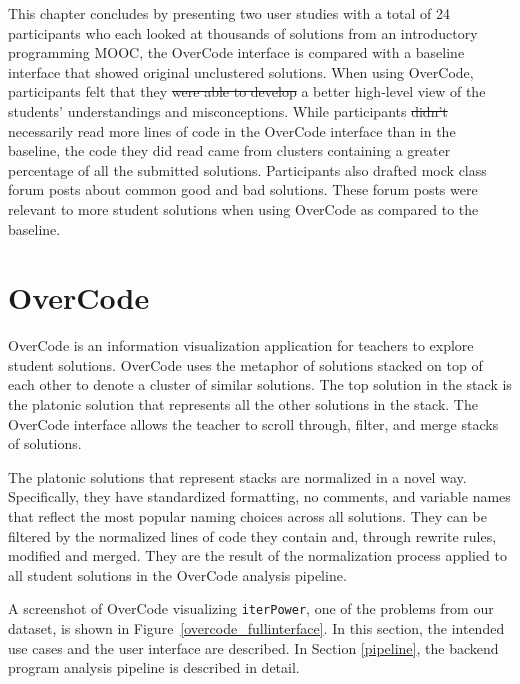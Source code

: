 \documentclass[12pt,twoside]{mitthesis}
\newcommand \codevar[1]{\texttt{#1}}
\providecommand{\DIFaddtex}[1]{{\protect\color{blue}\uwave{#1}}} %
\providecommand{\DIFdeltex}[1]{{\protect\color{red}\sout{#1}}}                      %
\providecommand{\DIFaddbegin}{} %
\providecommand{\DIFaddend}{} %
\providecommand{\DIFdelbegin}{} %
\providecommand{\DIFdelend}{} %
\providecommand{\DIFadd}[1]{\texorpdfstring{\DIFaddtex{#1}}{#1}} %
\providecommand{\DIFdel}[1]{\texorpdfstring{\DIFdeltex{#1}}{}} %
\begin{document}
This chapter concludes by presenting two user studies with a total of 24 participants who each looked at thousands of solutions from an introductory programming MOOC, the OverCode interface is compared with a baseline interface that showed original unclustered solutions. When using OverCode, participants felt that they \DIFdelbegin \DIFdel{were able to develop }\DIFdelend \DIFaddbegin \DIFadd{developed }\DIFaddend a better high-level view of the students' understandings and misconceptions. While participants \DIFdelbegin \DIFdel{didn't }\DIFdelend \DIFaddbegin \DIFadd{did not }\DIFaddend necessarily read more lines of code in the OverCode interface than in the baseline, the code they did read came from clusters containing a greater percentage of all the submitted solutions. Participants also drafted mock class forum posts about common good and bad solutions. These forum posts were relevant to more student solutions when using OverCode as compared to the baseline. 

\section{OverCode} \label{overcode}
OverCode is an information visualization application for teachers to explore student solutions. OverCode uses the metaphor of solutions stacked on top of each other to denote a cluster of similar solutions. The top solution in the stack is the platonic solution that represents all the other solutions in the stack. The OverCode interface allows the teacher to scroll through, filter, and merge stacks of solutions. 

The platonic solutions that represent stacks are normalized in a novel way. Specifically, they have standardized formatting, no comments, and variable names that reflect the most popular naming choices across all solutions. They can be filtered by the normalized lines of code they contain and, through rewrite rules, modified and merged. They are the result of the normalization process applied to all student solutions in the OverCode analysis pipeline. %

A screenshot of OverCode visualizing \codevar{iterPower}, one of the problems from our dataset, is shown in Figure~\ref{overcode_fullinterface}. In this section, the intended use cases and the user interface are described. In Section \ref{pipeline}, the backend program analysis pipeline is described in detail. 
\end{document}
